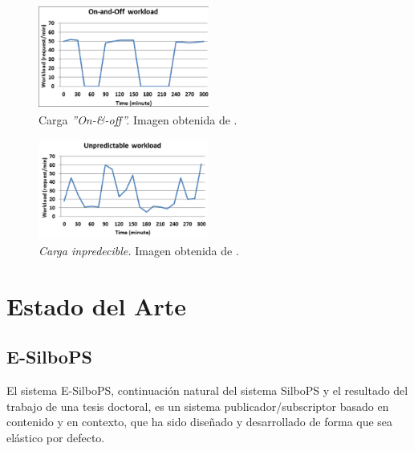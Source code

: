 \begin{figure}[htpb]
    \centering
    \includegraphics[width=0.5\textwidth]{images/types-of-workload/onoff-workload.png}
    \caption{Carga \textit{''On-\&-off''.} Imagen obtenida de \cite{paper:type_of_workloads}.}
    \label{fig:art_workloads-onoff}
\end{figure}

\begin{figure}[htpb]
    \centering
    \includegraphics[width=0.5\textwidth]{images/types-of-workload/unpred-workload.png}
    \caption{\textit{Carga inpredecible.} Imagen obtenida de \cite{paper:type_of_workloads}.}
    \label{fig:art_workloads-unpred}
\end{figure}





\section{Estado del Arte} \label{sct:art_stateoftheart}

\subsection{E-SilboPS} \label{ssct:art_stateoftheart_esilbops}


El sistema E-SilboPS, continuación natural del sistema SilboPS y el resultado del 
trabajo de una tesis doctoral\cite{thesis:tesisSVavassori}, es un sistema publicador/subscriptor 
basado en contenido y en contexto, que ha sido diseñado y desarrollado de forma que sea elástico
por defecto.

